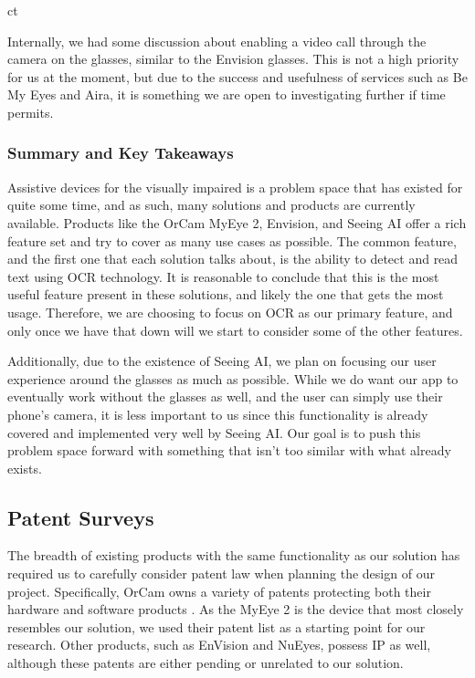 ct\documentclass[a4paper,11pt]{article}
\begin{document}
Internally, we had some discussion about enabling a video call through the camera on the glasses, similar to the Envision glasses. This is not a high priority for us at the moment, but due to the success and usefulness of services such as Be My Eyes and Aira, it is something we are open to investigating further if time permits.

\subsubsection{Summary and Key Takeaways}
Assistive devices for the visually impaired is a problem space that has existed for quite some time, and as such, many solutions and products are currently available. Products like the OrCam MyEye 2, Envision, and Seeing AI offer a rich feature set and try to cover as many use cases as possible. The common feature, and the first one that each solution talks about, is the ability to detect and read text using OCR technology. It is reasonable to conclude that this is the most useful feature present in these solutions, and likely the one that gets the most usage. Therefore, we are choosing to focus on OCR as our primary feature, and only once we have that down will we start to consider some of the other features.

Additionally, due to the existence of Seeing AI, we plan on focusing our user experience around the glasses as much as possible. While we do want our app to eventually work without the glasses as well, and the user can simply use their phone's camera, it is less important to us since this functionality is already covered and implemented very well by Seeing AI. Our goal is to push this problem space forward with something that isn't too similar with what already exists.

\subsection{Patent Surveys}
The breadth of existing products with the same functionality as our solution has required us to carefully consider patent law when planning the design of our project. Specifically, OrCam owns a variety of patents protecting both their hardware and software products \cite{orcam-patents}. As the MyEye 2 is the device that most closely resembles our solution, we used their patent list as a starting point for our research. Other products, such as EnVision and NuEyes, possess IP as well, although these patents are either pending \cite{envision-patent} or unrelated to our solution.
\end{document}
